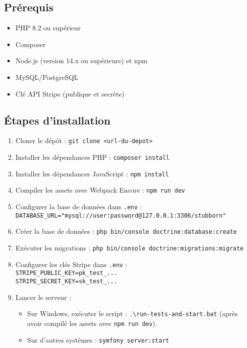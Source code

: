 \documentclass[a4paper,11pt]{article}
\begin{document}
\subsection{Prérequis}
\begin{itemize}
    \item PHP 8.2 ou supérieur
    \item Composer
    \item Node.js (version 14.x ou supérieure) et npm
    \item MySQL/PostgreSQL
    \item Clé API Stripe (publique et secrète)
\end{itemize}

\subsection{Étapes d'installation}
\begin{enumerate}
    \item Cloner le dépôt : \texttt{git clone <url-du-depot>}
    \item Installer les dépendances PHP : \texttt{composer install}
    \item Installer les dépendances JavaScript : \texttt{npm install}
    \item Compiler les assets avec Webpack Encore : \texttt{npm run dev}
    \item Configurer la base de données dans \texttt{.env} : \\
          \texttt{DATABASE\_URL="mysql://user:password@127.0.0.1:3306/stubborn"}
    \item Créer la base de données : \texttt{php bin/console doctrine:database:create}
    \item Exécuter les migrations : \texttt{php bin/console doctrine:migrations:migrate}
    \item Configurer les clés Stripe dans \texttt{.env} : \\
          \texttt{STRIPE\_PUBLIC\_KEY=pk\_test\_...} \\
          \texttt{STRIPE\_SECRET\_KEY=sk\_test\_...}
    \item Lancer le serveur :
    \begin{itemize}
        \item Sur Windows, exécuter le script : \texttt{.\textbackslash run-tests-and-start.bat} (après avoir compilé les assets avec \texttt{npm run dev}).
        \item Sur d’autres systèmes : \texttt{symfony server:start}
    \end{itemize}
\end{enumerate}
\end{document}
